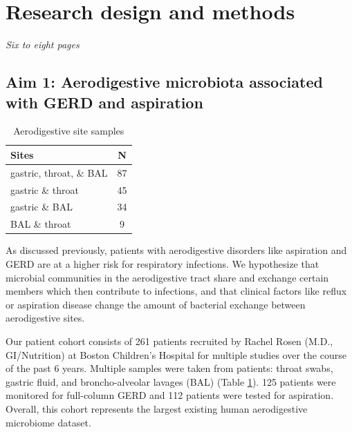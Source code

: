 \documentclass[12pt]{article}
\begin{document}
\section{Research design and methods}
\textit{Six to eight pages}

\subsection{Aim 1: Aerodigestive microbiota associated with GERD and aspiration}

\begin{table}
\begin{tabular}{|l|c|}
	\hline
	\textbf{Sites} & \textbf{N} \\
	\hline
	gastric, throat, \& BAL & 87 \\
	gastric \& throat & 45 \\
	gastric \& BAL & 34 \\
	BAL \& throat & 9 \\
	\hline 
\end{tabular}
\caption{Aerodigestive site samples}\label{tab:rosen_samples}
\end{table}

As discussed previously, patients with aerodigestive disorders like 
aspiration and GERD are at a higher risk for respiratory infections. 
We hypothesize that microbial communities in the aerodigestive tract 
share and exchange certain members which then contribute to 
infections, and that clinical factors like reflux or aspiration 
disease change the amount of bacterial exchange between aerodigestive 
sites.


Our patient cohort consists of 261 patients recruited by Rachel Rosen 
(M.D., GI/Nutrition) at Boston Children's Hospital for multiple 
studies over the course of the past 6 years. Multiple samples were 
taken from patients: throat swabs, gastric fluid, and broncho-alveolar 
lavages (BAL) (Table \ref{tab:rosen_samples}). 125 patients were 
monitored for full-column GERD and 112 patients were tested for 
aspiration. Overall, this cohort represents the largest existing human 
aerodigestive microbiome dataset.
\end{document}
